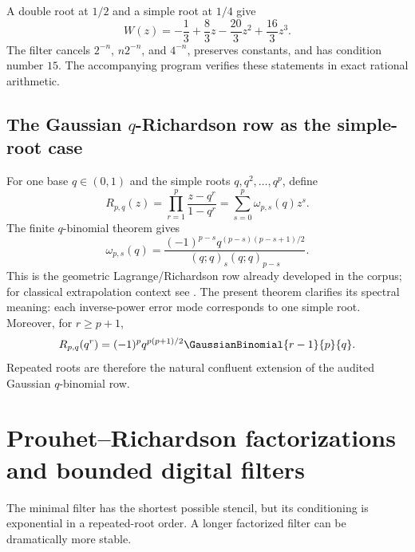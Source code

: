\documentclass[11pt]{article}
\numberwithin{equation}{section}
\theoremstyle{definition}
\theoremstyle{remark}
\begin{document}
\begin{example}
A double root at $1/2$ and a simple root at $1/4$ give
\begin{equation}
 W(z)=-\frac13+\frac83z-\frac{20}{3}z^2+\frac{16}{3}z^3.
 \label{p6:eq:mixed-filter}
\end{equation}
The filter cancels $2^{-n}$, $n2^{-n}$, and $4^{-n}$, preserves constants, and has
condition number $15$.  The accompanying program verifies these statements in exact
rational arithmetic.
\end{example}

\subsection{The Gaussian \texorpdfstring{$q$}{q}-Richardson row as the simple-root case}

For one base $q\in(0,1)$ and the simple roots $q,q^2,\ldots,q^p$, define
\begin{equation}
 R_{p,q}(z)=\prod_{r=1}^{p}\frac{z-q^r}{1-q^r}
 =\sum_{s=0}^{p}\omega_{p,s}(q)z^s.
 \label{p6:eq:q-richardson-poly}
\end{equation}
The finite $q$-binomial theorem gives
\begin{equation}
 \boxed{
 \omega_{p,s}(q)
 =\frac{(-1)^{p-s}q^{(p-s)(p-s+1)/2}}
 {(q;q)_s(q;q)_{p-s}}.}
 \label{p6:eq:q-richardson-weights}
\end{equation}
This is the geometric Lagrange/Richardson row already developed in the corpus; for
classical extrapolation context see \cite{p6:sidi2006}.  The
present theorem clarifies its spectral meaning: each inverse-power error mode corresponds
to one simple root.  Moreover, for $r\ge p+1$,
\begin{equation}
 R_{p,q}(q^r)
 =(-1)^pq^{p(p+1)/2}\GaussianBinomial{r-1}{p}{q}.
 \label{p6:eq:q-moment-transform}
\end{equation}
Repeated roots are therefore the natural confluent extension of the audited Gaussian
$q$-binomial row.

\section{Prouhet--Richardson factorizations and bounded digital filters}
\label{p6:sec:digital}

The minimal filter has the shortest possible stencil, but its conditioning is exponential
in a repeated-root order.  A longer factorized filter can be dramatically more stable.
\end{document}

